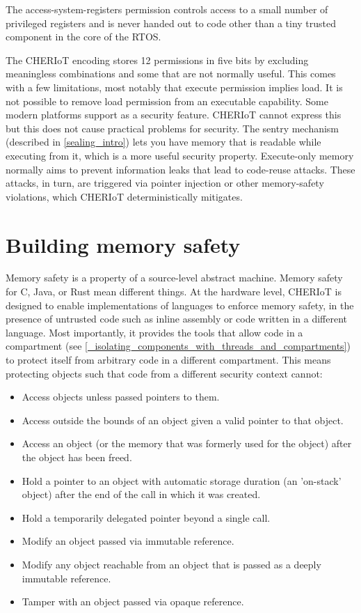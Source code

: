 The access-system-registers permission controls access to a small number of privileged registers and is never handed out to code other than a tiny trusted component in the core of the RTOS.

\begin{caution}
	The CHERIoT encoding stores 12 permissions in five bits by excluding meaningless combinations and some that are not normally useful.
	This comes with a few limitations, most notably that execute permission implies load.
	It is not possible to remove load permission from an executable capability.
	Some modern platforms support  as a security feature.
	CHERIoT cannot express this but this does not cause practical problems for security.
	The sentry mechanism (described in \ref{sealing_intro}) lets you have memory that is readable  while executing from it, which is a more useful security property.
	Execute-only memory normally aims to prevent information leaks that lead to code-reuse attacks.
	These attacks, in turn, are triggered via pointer injection or other memory-safety violations, which CHERIoT deterministically mitigates.
\end{caution}


\section{Building memory safety}

Memory safety is a property of a source-level abstract machine.
Memory safety for C, Java, or Rust mean different things.
At the hardware level, CHERIoT is designed to enable implementations of languages to enforce memory safety, in the presence of untrusted code such as inline assembly or code written in a different language.
Most importantly, it provides the tools that allow code in a compartment (see \ref{_isolating_components_with_threads_and_compartments}) to protect itself from arbitrary code in a different compartment.
This means protecting objects such that code from a different security context cannot:

\begin{itemize}
	\item{Access objects unless passed pointers to them.}
	\item{Access outside the bounds of an object given a valid pointer to that object.}
	\item{Access an object (or the memory that was formerly used for the object) after the object has been freed.}
	\item{Hold a pointer to an object with automatic storage duration (an 'on-stack' object) after the end of the call in which it was created.}
	\item{Hold a temporarily delegated pointer beyond a single call.}
	\item{Modify an object passed via immutable reference.}
	\item{Modify any object reachable from an object that is passed as a deeply immutable reference.}
	\item{Tamper with an object passed via opaque reference.}
\end{itemize}

